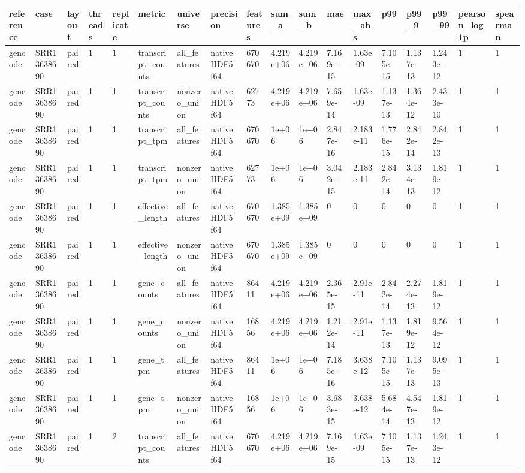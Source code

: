 \begin{tabular}{llllllllllllllllll}
\toprule
reference & case & layout & threads & replicate & metric & universe & precision & features & sum\_a & sum\_b & mae & max\_abs & p99 & p99\_9 & p99\_99 & pearson\_log1p & spearman \\
\midrule
gencode & SRR13638690 & paired & 1 & 1 & transcript\_counts & all\_features & native HDF5 f64 & 670670 & 4.219e+06 & 4.219e+06 & 7.169e-15 & 1.63e-09 & 7.105e-15 & 1.137e-13 & 1.243e-12 & 1 & 1 \\
gencode & SRR13638690 & paired & 1 & 1 & transcript\_counts & nonzero\_union & native HDF5 f64 & 62773 & 4.219e+06 & 4.219e+06 & 7.659e-14 & 1.63e-09 & 1.137e-13 & 1.364e-12 & 2.433e-10 & 1 & 1 \\
gencode & SRR13638690 & paired & 1 & 1 & transcript\_tpm & all\_features & native HDF5 f64 & 670670 & 1e+06 & 1e+06 & 2.847e-16 & 2.183e-11 & 1.776e-15 & 2.842e-14 & 2.842e-13 & 1 & 1 \\
gencode & SRR13638690 & paired & 1 & 1 & transcript\_tpm & nonzero\_union & native HDF5 f64 & 62773 & 1e+06 & 1e+06 & 3.042e-15 & 2.183e-11 & 2.842e-14 & 3.134e-13 & 1.819e-12 & 1 & 1 \\
gencode & SRR13638690 & paired & 1 & 1 & effective\_length & all\_features & native HDF5 f64 & 670670 & 1.385e+09 & 1.385e+09 & 0 & 0 & 0 & 0 & 0 & 1 & 1 \\
gencode & SRR13638690 & paired & 1 & 1 & effective\_length & nonzero\_union & native HDF5 f64 & 670670 & 1.385e+09 & 1.385e+09 & 0 & 0 & 0 & 0 & 0 & 1 & 1 \\
gencode & SRR13638690 & paired & 1 & 1 & gene\_counts & all\_features & native HDF5 f64 & 86411 & 4.219e+06 & 4.219e+06 & 2.365e-15 & 2.91e-11 & 2.842e-14 & 2.274e-13 & 1.819e-12 & 1 & 1 \\
gencode & SRR13638690 & paired & 1 & 1 & gene\_counts & nonzero\_union & native HDF5 f64 & 16856 & 4.219e+06 & 4.219e+06 & 1.212e-14 & 2.91e-11 & 1.137e-13 & 1.819e-12 & 9.564e-12 & 1 & 1 \\
gencode & SRR13638690 & paired & 1 & 1 & gene\_tpm & all\_features & native HDF5 f64 & 86411 & 1e+06 & 1e+06 & 7.185e-16 & 3.638e-12 & 7.105e-15 & 1.137e-13 & 9.095e-13 & 1 & 1 \\
gencode & SRR13638690 & paired & 1 & 1 & gene\_tpm & nonzero\_union & native HDF5 f64 & 16856 & 1e+06 & 1e+06 & 3.683e-15 & 3.638e-12 & 5.684e-14 & 4.547e-13 & 1.819e-12 & 1 & 1 \\
gencode & SRR13638690 & paired & 1 & 2 & transcript\_counts & all\_features & native HDF5 f64 & 670670 & 4.219e+06 & 4.219e+06 & 7.169e-15 & 1.63e-09 & 7.105e-15 & 1.137e-13 & 1.243e-12 & 1 & 1 \\

\end{tabular}

